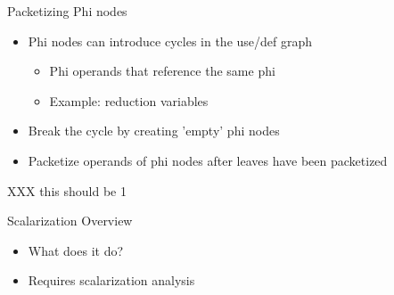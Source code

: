 \begin{frame}[fragile]{Packetizing Phi nodes}

\begin{itemize}
    \item Phi nodes can introduce cycles in the use/def graph
    \begin{itemize}
        \item Phi operands that reference the same phi
        \item Example: reduction variables
    \end{itemize}
    \item Break the cycle by creating 'empty' phi nodes
    \item Packetize operands of phi nodes after leaves have been packetized
\end{itemize}

XXX this should be 1


\end{frame}



\begin{frame}{Scalarization Overview}

\begin{itemize}
    \item What does it do?
    \item Requires scalarization analysis
\end{itemize}

\end{frame}


